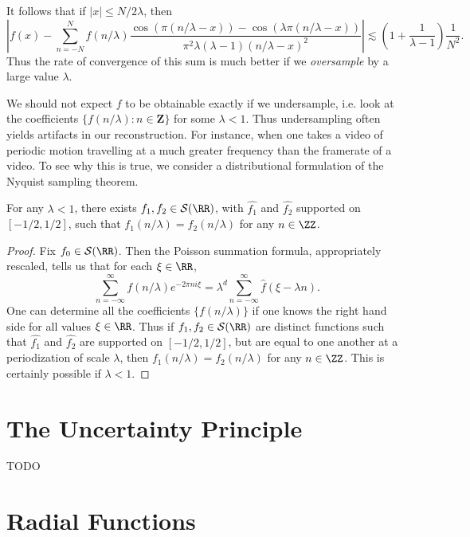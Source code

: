 %
It follows that if $|x| \leq N/2\lambda$, then
%
\[ \left| f(x) - \sum_{n = -N}^N f(n/\lambda) \frac{\cos(\pi (n / \lambda - x)) - \cos(\lambda \pi (n / \lambda - x))}{\pi^2 \lambda (\lambda - 1)(n/\lambda - x)^2} \right| \lesssim \left( 1 + \frac{1}{\lambda - 1} \right) \frac{1}{N^2}. \]
%
Thus the rate of convergence of this sum is much better if we \emph{oversample} by a large value $\lambda$.

We should not expect $f$ to be obtainable exactly if we undersample, i.e. look at the coefficients $\{ f(n/\lambda) : n \in \mathbf{Z} \}$ for some $\lambda < 1$. Thus undersampling often yields artifacts in our reconstruction. For instance, when one takes a video of periodic motion travelling at a much greater frequency than the framerate of a video. To see why this is true, we consider a distributional formulation of the Nyquist sampling theorem.

\begin{theorem}
    For any $\lambda < 1$, there exists $f_1,f_2 \in \mathcal{S}(\RR)$, with $\widehat{f_1}$ and $\widehat{f_2}$ supported on $[-1/2,1/2]$, such that $f_1(n/\lambda) = f_2(n/\lambda)$ for any $n \in \ZZ$.
\end{theorem}
\begin{proof}
    Fix $f_0 \in \mathcal{S}(\RR)$. Then the Poisson summation formula, appropriately rescaled, tells us that for each $\xi \in \RR$,
    \[ \sum_{n = -\infty}^\infty f(n/\lambda) e^{-2 \pi n i \xi} = \lambda^d \sum_{n = -\infty}^\infty \widehat{f}(\xi - \lambda n). \]
    One can determine all the coefficients $\{ f(n/\lambda) \}$ if one knows the right hand side for all values $\xi \in \RR$. Thus if $f_1,f_2 \in \mathcal{S}(\RR)$ are distinct functions such that $\widehat{f_1}$ and $\widehat{f_2}$ are supported on $[-1/2,1/2]$, but are equal to one another at a periodization of scale $\lambda$, then $f_1(n/\lambda) = f_2(n/\lambda)$ for any $n \in \ZZ$. This is certainly possible if $\lambda < 1$.
\end{proof}

\section{The Uncertainty Principle}

TODO

\section{Radial Functions}

